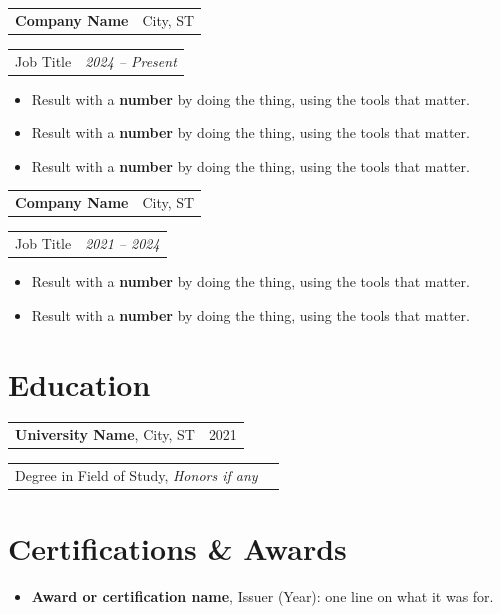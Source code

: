 \documentclass[letterpaper,10pt]{article}
\makeatletter
\newcommand{\EntryGap}{4pt}     %
\newcommand{\BulletGap}{2pt}    %
\newcommand{\tworow}[2]{%
  \begin{tabularx}{\textwidth}{@{}>{\raggedright\arraybackslash}X r@{}}
    #1 & #2
  \end{tabularx}\par}
\newcommand{\bulletsStart}{\vspace{\BulletGap}\begin{itemize}[leftmargin=0.2in,noitemsep,topsep=0pt,parsep=0pt]}
\newcommand{\bulletsEnd}{\end{itemize}}
\newcommand{\entrygap}{\vspace{\EntryGap}}
\makeatother
\begin{document}
\tworow{\textbf{Company Name}}{City, ST}
\tworow{Job Title}{\textit{2024 -- Present}}
\bulletsStart
  \item Result with a \textbf{number} by doing the thing, using the tools that matter.
  \item Result with a \textbf{number} by doing the thing, using the tools that matter.
  \item Result with a \textbf{number} by doing the thing, using the tools that matter.
\bulletsEnd

\entrygap

\tworow{\textbf{Company Name}}{City, ST}
\tworow{Job Title}{\textit{2021 -- 2024}}
\bulletsStart
  \item Result with a \textbf{number} by doing the thing, using the tools that matter.
  \item Result with a \textbf{number} by doing the thing, using the tools that matter.
\bulletsEnd

\section{Education}
\small

\tworow{\textbf{University Name}, City, ST}{2021}
\tworow{Degree in Field of Study, \textit{Honors if any}}{}

\section{Certifications \& Awards}
\small
\bulletsStart
  \item \textbf{Award or certification name}, Issuer (Year): one line on what it was for.
\bulletsEnd
\end{document}
